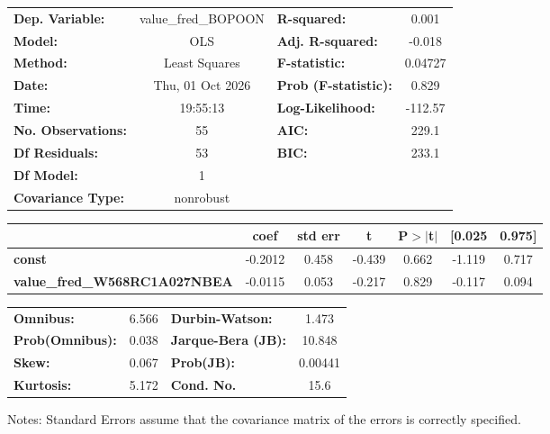 \begin{center}
\begin{tabular}{lclc}
\toprule
\textbf{Dep. Variable:}               & value\_fred\_BOPOON & \textbf{  R-squared:         } &     0.001   \\
\textbf{Model:}                       &         OLS         & \textbf{  Adj. R-squared:    } &    -0.018   \\
\textbf{Method:}                      &    Least Squares    & \textbf{  F-statistic:       } &   0.04727   \\
\textbf{Date:}                        &   Thu, 01 Oct 2026  & \textbf{  Prob (F-statistic):} &    0.829    \\
\textbf{Time:}                        &       19:55:13      & \textbf{  Log-Likelihood:    } &   -112.57   \\
\textbf{No. Observations:}            &            55       & \textbf{  AIC:               } &     229.1   \\
\textbf{Df Residuals:}                &            53       & \textbf{  BIC:               } &     233.1   \\
\textbf{Df Model:}                    &             1       & \textbf{                     } &             \\
\textbf{Covariance Type:}             &      nonrobust      & \textbf{                     } &             \\
\bottomrule
\end{tabular}
\begin{tabular}{lcccccc}
                                      & \textbf{coef} & \textbf{std err} & \textbf{t} & \textbf{P$> |$t$|$} & \textbf{[0.025} & \textbf{0.975]}  \\
\midrule
\textbf{const}                        &      -0.2012  &        0.458     &    -0.439  &         0.662        &       -1.119    &        0.717     \\
\textbf{value\_fred\_W568RC1A027NBEA} &      -0.0115  &        0.053     &    -0.217  &         0.829        &       -0.117    &        0.094     \\
\bottomrule
\end{tabular}
\begin{tabular}{lclc}
\textbf{Omnibus:}       &  6.566 & \textbf{  Durbin-Watson:     } &    1.473  \\
\textbf{Prob(Omnibus):} &  0.038 & \textbf{  Jarque-Bera (JB):  } &   10.848  \\
\textbf{Skew:}          &  0.067 & \textbf{  Prob(JB):          } &  0.00441  \\
\textbf{Kurtosis:}      &  5.172 & \textbf{  Cond. No.          } &     15.6  \\
\bottomrule
\end{tabular}
\end{center}

Notes: \newline
 [1] Standard Errors assume that the covariance matrix of the errors is correctly specified.